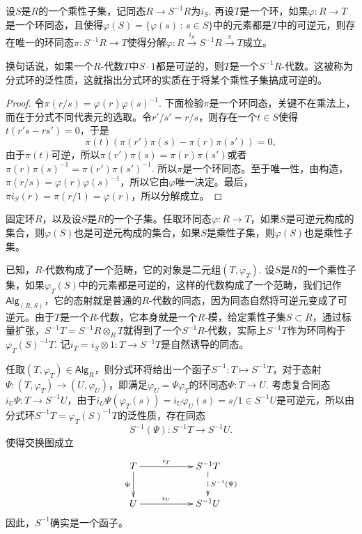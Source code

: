 \begin{pro}
设$S$是$R$的一个乘性子集，记同态$R\to S^{-1}R$为$i_S$. 再设$T$是一个环，如果$\varphi:R\to T$是一个环同态，且使得$\varphi(S)=\{\varphi(s)\,:\, s\in S\}$中的元素都是$T$中的可逆元，则存在唯一的环同态$\pi:S^{-1}R\to T$使得分解$\varphi:R\xrightarrow{i_S}S^{-1}R\xrightarrow{\pi} T$成立。
\end{pro}

换句话说，如果一个$R$-代数$T$中$S\cdot 1$都是可逆的，则$T$是一个$S^{-1}R$-代数。这被称为分式环的泛性质，这就指出分式环的实质在于将某个乘性子集搞成可逆的。

\begin{proof}
	令$\pi(r/s)=\varphi(r)\varphi(s)^{-1}$. 下面检验$\pi$是一个环同态，关键不在乘法上，而在于分式不同代表元的选取。令$r'/s'=r/s$，则存在一个$t\in S$使得$t(r's-rs')=0$，于是
	\[
		\pi(t)(\pi(r')\pi(s)-\pi(r)\pi(s'))=0,
	\]
	由于$\pi(t)$可逆，所以$\pi(r')\pi(s)=\pi(r)\pi(s')$或者$\pi(r)\pi(s)^{-1}=\pi(r')\pi(s')^{-1}$. 所以$\pi$是一个环同态。至于唯一性，由构造，$\pi(r/s)=\varphi(r)\varphi(s)^{-1}$，所以它由$\varphi$唯一决定。最后，$\pi i_S(r)=\pi(r/1)=\varphi(r)$，所以分解成立。
\end{proof}

\para 固定环$R$，以及设$S$是$R$的一个子集。任取环同态$\varphi:R\to T$，如果$S$是可逆元构成的集合，则$\varphi(S)$也是可逆元构成的集合，如果$S$是乘性子集，则$\varphi(S)$也是乘性子集。

已知，$R$-代数构成了一个范畴，它的对象是二元组$(T,\varphi_T)$. 设$S$是$R$的一个乘性子集，如果$\varphi_T(S)$中的元素都是可逆的，这样的代数构成了一个范畴，我们记作$\mathsf{Alg}_{(R,S)}$，它的态射就是普通的$R$-代数的同态，因为同态自然将可逆元变成了可逆元。由于$T$是一个$R$-代数，它本身就是一个$R$-模，给定乘性子集$S\subset R$，通过标量扩张，$S^{-1}T=S^{-1}R\otimes_R T$就得到了一个$S^{-1}R$-代数，实际上$S^{-1}T$作为环同构于$\varphi_T(S)^{-1}T$. 记$i_T=i_S\otimes 1:T\to S^{-1}T$是自然诱导的同态。

任取$(T,\varphi_T)\in \mathsf{Alg}_R$，则分式环将给出一个函子$S^{-1}:T\mapsto S^{-1}T$，对于态射$\Psi:(T,\varphi_T)\to (U,\varphi_U)$，即满足$\varphi_U=\Psi\varphi_T$的环同态$\Psi:T\to U$. 考虑复合同态$i_{U}\Psi:T\to S^{-1}U$，由于$i_{U}\Psi(\varphi_T(s))=i_{U}\varphi_U(s)=s/1\in S^{-1}U$是可逆元，所以由分式环$S^{-1}T=\varphi_T(S)^{-1}T$的泛性质，存在同态
\[
	S^{-1}(\Psi):S^{-1}T\to S^{-1}U.
\]
使得交换图成立
\[
\begin{xy}
	\xymatrix{
		T\ar[rr]^-{i_T} \ar[d]_-{\Psi}&&S^{-1}T \ar@{-->}[d]^-{S^{-1}(\Psi)}\\
		U\ar[rr]^-{i_U} &&S^{-1}U
	}
\end{xy}
\]
因此，$S^{-1}$确实是一个函子。

